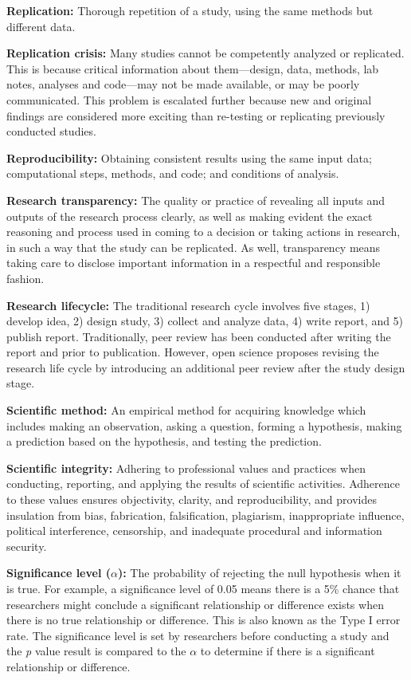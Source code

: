 \documentclass[
]{book}
\begin{document}
\textbf{Replication:} Thorough repetition of a study, using the same methods but different data.

\textbf{Replication crisis:} Many studies cannot be competently analyzed or replicated. This is because critical information about them---design, data, methods, lab notes, analyses and code---may not be made available, or may be poorly communicated. This problem is escalated further because new and original findings are considered more exciting than re-testing or replicating previously conducted studies.

\textbf{Reproducibility:} Obtaining consistent results using the same input data; computational steps, methods, and code; and conditions of analysis.

\textbf{Research transparency:} The quality or practice of revealing all inputs and outputs of the research process clearly, as well as making evident the exact reasoning and process used in coming to a decision or taking actions in research, in such a way that the study can be replicated. As well, transparency means taking care to disclose important information in a respectful and responsible fashion.

\textbf{Research lifecycle:} The traditional research cycle involves five stages, 1) develop idea, 2) design study, 3) collect and analyze data, 4) write report, and 5) publish report. Traditionally, peer review has been conducted after writing the report and prior to publication. However, open science proposes revising the research life cycle by introducing an additional peer review after the study design stage.

\textbf{Scientific method:} An empirical method for acquiring knowledge which includes making an observation, asking a question, forming a hypothesis, making a prediction based on the hypothesis, and testing the prediction.

\textbf{Scientific integrity:} Adhering to professional values and practices when conducting, reporting, and applying the results of scientific activities. Adherence to these values ensures objectivity, clarity, and reproducibility, and provides insulation from bias, fabrication, falsification, plagiarism, inappropriate influence, political interference, censorship, and inadequate procedural and information security.

\textbf{Significance level (\(\alpha\)):} The probability of rejecting the null hypothesis when it is true. For example, a significance level of 0.05 means there is a 5\% chance that researchers might conclude a significant relationship or difference exists when there is no true relationship or difference. This is also known as the Type I error rate. The significance level is set by researchers before conducting a study and the \emph{p} value result is compared to the \(\alpha\) to determine if there is a significant relationship or difference.
\end{document}
